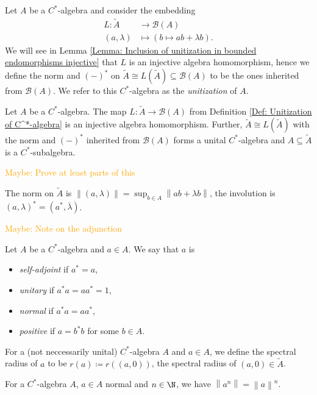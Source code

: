 \documentclass[american]{scrartcl}
\newcommand{\weaktodo}[1]{\textcolor{orange}{Maybe: #1}}
\renewcommand{\norm}[1]{\left\lVert #1 \right\rVert}
\newcommand{\cB}{\mathcal{B}}
\newcommand{\conj}[1]{\overline{#1}}
\begin{document}
\begin{definition}\label{Def: Unitization of C^*-algebra}
	Let $A$ be a $C^*$-algebra and consider the embedding
	\begin{align*}
		L\colon \tilde{A}&\to \cB(A)\\
		(a,\lambda)&\mapsto (b\mapsto ab+\lambda b).
	\end{align*}
	We will see in Lemma \ref{Lemma: Inclusion of unitization in bounded endomorphisms injective} that $L$ is an injective algebra homomorphism, hence we define the norm and $(-)^*$ on $\tilde{A}\cong L(\tilde{A})\subseteq \cB(A)$ to be the ones inherited from $\cB(A)$. We refer to this $C^*$-algebra as the \textit{unitization} of $A$.
\end{definition}
\begin{lemma}\label{Lemma: Inclusion of unitization in bounded endomorphisms injective}
	Let $A$ be a $C^*$-algebra. The map $L\colon \tilde{A}\to\cB(A)$ from Definition \ref{Def: Unitization of C^*-algebra} is an injective algebra homomorphism. Further, $\tilde{A}\cong L(\tilde A)$ with the norm and $(-)^*$ inherited from $\cB(A)$ forms a unital $C^*$-algebra and $A\subseteq \tilde{A}$ is a $C^*$-subalgebra.
\end{lemma}
\weaktodo{Prove at least parts of this}
\begin{note}
	The norm on $\tilde{A}$ is $\norm{(a,\lambda)}=\sup_{b\in A}\norm{ab+\lambda b}$, the involution is $(a,\lambda)^*=(a^*,\conj{\lambda})$.
\end{note}
\weaktodo{Note on the adjunction}
\begin{definition}
	Let $A$ be a $C^*$-algebra and $a\in A$. We say that $a$ is
	\begin{itemize}
		\item \textit{self-adjoint} if $a^*=a$,
		\item \textit{unitary} if $a^*a=aa^*=1$,
		\item \textit{normal} if $a^*a=aa^*$,
		\item \textit{positive} if $a=b^*b$ for some $b\in A$.
	\end{itemize}
\end{definition}
\begin{definition}
	For a (not neccessarily unital) $C^*$-algebra $A$ and $a\in A$, we define the spectral radius of $a$ to be $r(a)\coloneqq r((a,0))$, the spectral radius of $(a,0)\in \tilde{A}$.
\end{definition}
\begin{proposition}\label{Lemma: Norm of powers of normal elements}
	For a $C^*$-algebra $A$, $a\in A$ normal and $n\in \N$, we have $\norm{a^n}=\norm{a}^n$.
\end{proposition}
\end{document}
